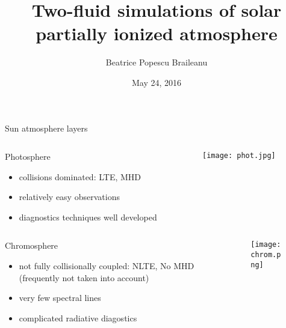 \documentclass{beamer}
\begin{document}
\title[Two-fluid simulations]  
{Two-fluid simulations of solar partially ionized atmosphere }
\author[]{Beatrice Popescu Braileanu }
\date{May 24, 2016}

\begin{frame}
\maketitle
\end{frame}

\begin{frame}[t]{Sun atmosphere layers}
\vspace*{-22pt}
\begin{columns}[b]
    \begin{column}{0.6\textwidth}
		Photosphere
        \begin{itemize}
					\item collisions dominated: LTE, MHD 
					\item	relatively easy observations 
					\item	diagnostics techniques well developed 
        \end{itemize}
    \end{column}
    \begin{column}{0.5\textwidth}
			\begin{figure}[t]
			 \texttt{[image: phot.jpg]}
			\end{figure}
    \end{column}
\end{columns}

\begin{columns}[b]
    \begin{column}{0.6\textwidth}
		Chromosphere
        \begin{itemize}
					\item not fully collisionally coupled: NLTE, No MHD (frequently not taken into account)
					\item very few spectral lines 
					\item complicated radiative diagostics 
        \end{itemize}
    \end{column}
    \begin{column}{0.5\textwidth}
			\begin{figure}[t]
			 \centering
			 \texttt{[image: chrom.png]}
			\end{figure}
    \end{column}
\end{columns}


\end{frame}
\end{document}
